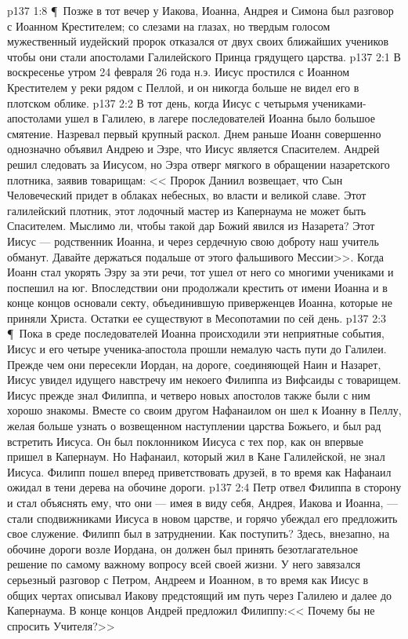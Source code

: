 \vs p137 1:8 \P\ Позже в тот вечер у Иакова, Иоанна, Андрея и Симона был разговор с Иоанном Крестителем; со слезами на глазах, но твердым голосом мужественный иудейский пророк отказался от двух своих ближайших учеников чтобы они стали апостолами Галилейского Принца грядущего царства.
\vs p137 2:1 В воскресенье утром 24 февраля 26 года н.э. Иисус простился с Иоанном Крестителем у реки рядом с Пеллой, и он никогда больше не видел его в плотском облике.
\vs p137 2:2 В тот день, когда Иисус с четырьмя учениками\hyp{}апостолами ушел в Галилею, в лагере последователей Иоанна было большое смятение. Назревал первый крупный раскол. Днем раньше Иоанн совершенно однозначно объявил Андрею и Эзре, что Иисус является Спасителем. Андрей решил следовать за Иисусом, но Эзра отверг мягкого в обращении назаретского плотника, заявив товарищам: << Пророк Даниил возвещает, что Сын Человеческий придет в облаках небесных, во власти и великой славе. Этот галилейский плотник, этот лодочный мастер из Капернаума не может быть Спасителем. Мыслимо ли, чтобы такой дар Божий явился из Назарета? Этот Иисус --- родственник Иоанна, и через сердечную свою доброту наш учитель обманут. Давайте держаться подальше от этого фальшивого Мессии>>. Когда Иоанн стал укорять Эзру за эти речи, тот ушел от него со многими учениками и поспешил на юг. Впоследствии они продолжали крестить от имени Иоанна и в конце концов основали секту, объединившую приверженцев Иоанна, которые не приняли Христа. Остатки ее существуют в Месопотамии по сей день.
\vs p137 2:3 \P\ Пока в среде последователей Иоанна происходили эти неприятные события, Иисус и его четыре ученика\hyp{}апостола прошли немалую часть пути до Галилеи. Прежде чем они пересекли Иордан, на дороге, соединяющей Наин и Назарет, Иисус увидел идущего навстречу им некоего Филиппа из Вифсаиды с товарищем. Иисус прежде знал Филиппа, и четверо новых апостолов также были с ним хорошо знакомы. Вместе со своим другом Нафанаилом он шел к Иоанну в Пеллу, желая больше узнать о возвещенном наступлении царства Божьего, и был рад встретить Иисуса. Он был поклонником Иисуса с тех пор, как он впервые пришел в Капернаум. Но Нафанаил, который жил в Кане Галилейской, не знал Иисуса. Филипп пошел вперед приветствовать друзей, в то время как Нафанаил ожидал в тени дерева на обочине дороги.
\vs p137 2:4 Петр отвел Филиппа в сторону и стал объяснять ему, что они --- имея в виду себя, Андрея, Иакова и Иоанна, --- стали сподвижниками Иисуса в новом царстве, и горячо убеждал его предложить свое служение. Филипп был в затруднении. Как поступить? Здесь, внезапно, на обочине дороги возле Иордана, он должен был принять безотлагательное решение по самому важному вопросу всей своей жизни. У него завязался серьезный разговор с Петром, Андреем и Иоанном, в то время как Иисус в общих чертах описывал Иакову предстоящий им путь через Галилею и далее до Капернаума. В конце концов Андрей предложил Филиппу:<< Почему бы не спросить Учителя?>>
